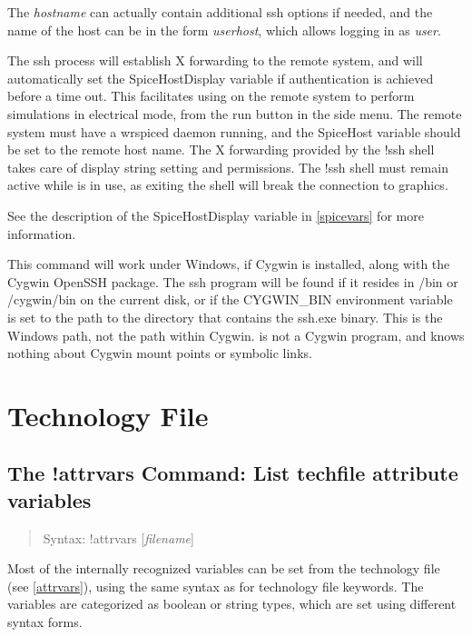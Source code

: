 The {\it hostname} can actually contain additional {\vt ssh} options
if needed, and the name of the host can be in the form {\it
user\/}{\vt \@}{\it host\/}, which allows logging in as {\it user\/}.
 
The {\vt ssh} process will establish X forwarding to the remote
system, and will automatically set the {\et SpiceHostDisplay} variable
if authentication is achieved before a time out.  This facilitates
using {\WRspice} on the remote system to perform simulations in
electrical mode, from the {\cb run} button in the side menu.  The
remote system must have a {\vt wrspiced} daemon running, and the {\et
SpiceHost} variable should be set to the remote host name.  The X
forwarding provided by the {\cb !ssh} shell takes care of display
string setting and permissions.  The {\cb !ssh} shell must remain
active while {\WRspice} is in use, as exiting the shell will break the
connection to {\WRspice} graphics.
 
See the description of the {\et SpiceHostDisplay} variable in
\ref{spicevars} for more information.
 
This command will work under Windows, if Cygwin is installed, along
with the Cygwin OpenSSH package.  The {\vt ssh} program will be found
if it resides in {\vt /bin} or {\vt /cygwin/bin} on the current disk,
or if the {\et CYGWIN\_BIN} environment variable is set to the path to
the directory that contains the {\vt ssh.exe} binary.  This is the
Windows path, not the path within Cygwin.  {\Xic} is not a Cygwin
program, and knows nothing about Cygwin mount points or symbolic
links.

\section{Technology File}

\subsection{The {\cb !attrvars} Command: List techfile attribute variables}
\begin{quote}
Syntax: {\vt !attrvars} [{\it filename\/}]
\end{quote}
Most of the internally recognized variables can be set from the
technology file (see \ref{attrvars}), using the same syntax as for
technology file keywords.  The variables are categorized as boolean or
string types, which are set using different syntax forms.

